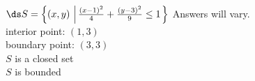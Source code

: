 {$\ds S = \left\{(x,y)\,\left| \, \frac{(x-1)^2}{4}+\frac{(y-3)^2}{9}\leq 1\right.\right\}$}
{Answers will vary.\\
interior point: $(1,3)$\\
boundary point: $(3,3)$\\
$S$ is a closed set\\
$S$ is bounded
}
